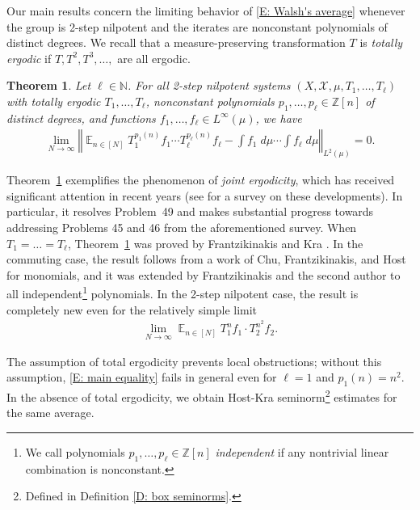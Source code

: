 \documentclass[11pt]{amsart}
\newtheorem{theorem}[lemma]{Theorem}
\theoremstyle{definition}
\DeclareMathOperator*{\E}{\mathbb{E}}
\newcommand{\N}{{\mathbb N}}
\newcommand{\Z}{{\mathbb Z}}
\newcommand{\CX}{{\mathcal X}}
\newcommand{\norm}[1]{\left\Vert #1\right\Vert}
\newcommand{\1}{{\mathbf{1}}}
\begin{document}
Our main results concern the limiting behavior of \eqref{E: Walsh's average} whenever the group is 2-step nilpotent and the iterates are nonconstant polynomials of distinct degrees. {We recall that a measure-preserving transformation $T$ is \textit{totally ergodic} if $T, T^2, T^3, \ldots, $ are all ergodic.}
\begin{theorem}\label{T: nilpotent joint ergodicity}
    Let $\ell\in\N$. For all 2-step nilpotent systems $(X, \CX, \mu, T_1, \ldots, T_\ell)$ with totally ergodic $T_1, \ldots, T_\ell$, nonconstant polynomials $p_1, \ldots, p_\ell\in\Z[n]$ of distinct degrees, and functions $f_1, \ldots, f_\ell\in L^\infty(\mu)$, we have
    \begin{align}\label{E: main equality}
    \lim_{N\to\infty}\norm{\E_{n\in[N]}T_1^{p_1(n)}f_1\cdots T_\ell^{p_\ell(n)}f_\ell - \int f_1\; d\mu\cdots \int f_\ell\; d\mu}_{L^2(\mu)} = 0.
\end{align}
\end{theorem}
Theorem~\ref{T: nilpotent joint ergodicity} exemplifies the phenomenon of \textit{joint ergodicity}, which has received significant attention in recent years (see \cite{Kuc26} for a survey on these developments). In particular, it resolves Problem~49 and makes substantial progress towards addressing Problems 45 and 46 from the aforementioned survey. 
When $T_1 = \ldots = T_\ell$, Theorem~\ref{T: nilpotent joint ergodicity} was proved by Frantzikinakis and Kra \cite{FrKr05}. In the commuting case, the result follows from a work of Chu, Frantzikinakis, and Host \cite{CFH11} for monomials, and it was extended by Frantzikinakis and the second author \cite{FrKu22a} to all independent\footnote{We call polynomials $p_1, \ldots, p_\ell\in\Z[n]$ \textit{independent} if any nontrivial  linear combination is nonconstant.} polynomials. In the 2-step nilpotent case, the result is completely new even for the relatively simple limit
\begin{align*}
    \lim_{N\to\infty}\E_{n\in[N]}T_1^n f_1\cdot T_2^{n^2}f_2.
\end{align*}

The assumption of total ergodicity prevents local obstructions; without this assumption, \eqref{E: main equality} fails in general even for $\ell=1$ and $p_1(n)=n^2$. In the absence of total ergodicity, we obtain Host-Kra seminorm\footnote{Defined in Definition \ref{D: box seminorms}.} estimates for the same average.
\end{document}
